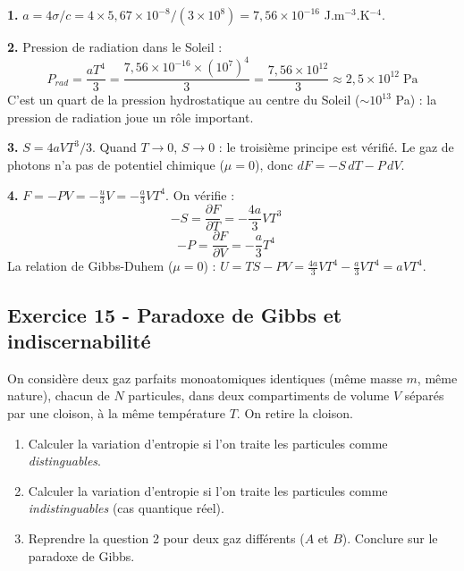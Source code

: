 \documentclass[12pt,a4paper]{article}
\begin{document}
\begin{boitecorrige}
\textbf{1.} $a = 4\sigma/c = 4\times5{,}67\times10^{-8}/(3\times10^8) = 7{,}56\times10^{-16}$ J.m$^{-3}$.K$^{-4}$.

\textbf{2.} Pression de radiation dans le Soleil :
\[
P_{rad} = \frac{aT^4}{3} = \frac{7{,}56\times10^{-16}\times(10^7)^4}{3} = \frac{7{,}56\times10^{12}}{3}\approx 2{,}5\times10^{12}\;\text{Pa}
\]
C'est un quart de la pression hydrostatique au centre du Soleil ($\sim 10^{13}$ Pa) : la pression de radiation joue un rôle important.

\textbf{3.} $S = 4aVT^3/3$. Quand $T\to 0$, $S\to 0$ : le troisième principe est vérifié. Le gaz de photons n'a pas de potentiel chimique ($\mu=0$), donc $dF = -S\,dT - P\,dV$.

\textbf{4.} $F = -PV = -\frac{u}{3}V = -\frac{a}{3}VT^4$. On vérifie :
\[
-S = \frac{\partial F}{\partial T} = -\frac{4a}{3}VT^3 \quad
\]
\[
-P = \frac{\partial F}{\partial V} = -\frac{a}{3}T^4 \quad
\]
La relation de Gibbs-Duhem ($\mu=0$) : $U = TS - PV = \frac{4a}{3}VT^4 - \frac{a}{3}VT^4 = aVT^4$.
\end{boitecorrige}

\subsection*{Exercice 15 - Paradoxe de Gibbs et indiscernabilité \niveau{\moyen}}

\begin{boiteexercice}
On considère deux gaz parfaits monoatomiques identiques (même masse $m$, même nature), chacun de $N$ particules, dans deux compartiments de volume $V$ séparés par une cloison, à la même température $T$. On retire la cloison.
\begin{enumerate}
  \item Calculer la variation d'entropie si l'on traite les particules comme \emph{distinguables}.
  \item Calculer la variation d'entropie si l'on traite les particules comme \emph{indistinguables} (cas quantique réel).
  \item Reprendre la question 2 pour deux gaz différents ($A$ et $B$). Conclure sur le paradoxe de Gibbs.
\end{enumerate}
\end{boiteexercice}
\end{document}
